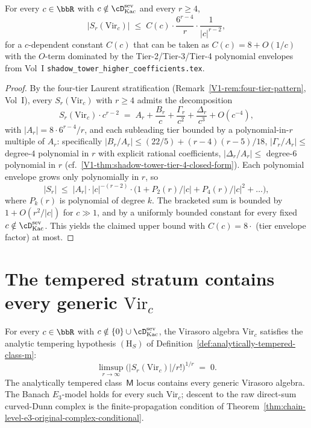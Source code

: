 \begin{proposition}
\label{prop:virasoro-s-r-upper-bound}
For every $c \in \bbR$ with
$c \notin \cD^{\mathrm{sev}}_{\mathrm{Kac}}$ and every $r \ge 4$,
\[
 \lvert S_r(\mathrm{Vir}_c) \rvert
 \;\le\;
 C(c) \cdot \frac{6^{r - 4}}{r}
 \cdot
 \frac{1}{\lvert c \rvert^{r - 2}},
\]
for a $c$-dependent constant $C(c)$ that can be taken as
$C(c) = 8 + O(1/c)$ with the $O$-term dominated by the
Tier-2/Tier-3/Tier-4 polynomial envelopes from Vol~I
\texttt{shadow\_tower\_higher\_coefficients.tex}.
\end{proposition}

\begin{proof}
By the four-tier Laurent stratification
(Remark~\ref{V1-rem:four-tier-pattern}, Vol~I), every $S_r(\mathrm{Vir}_c)$
with $r \ge 4$ admits the decomposition
\[
 S_r(\mathrm{Vir}_c) \cdot c^{r-2}
 \;=\; A_r + \frac{B_r}{c} + \frac{\Gamma_r}{c^2} + \frac{\Delta_r}{c^3}
 + O(c^{-4}),
\]
with $\lvert A_r \rvert = 8 \cdot 6^{r-4} / r$, and each subleading
tier bounded by a polynomial-in-$r$ multiple of $A_r$: specifically
$\lvert B_r / A_r \rvert \le (22/5) + (r-4)(r-5)/18$,
$\lvert \Gamma_r / A_r \rvert \le$ degree-$4$ polynomial in $r$ with
explicit rational coefficients,
$\lvert \Delta_r / A_r \rvert \le$ degree-$6$ polynomial in $r$
(cf.\ \ref{V1-thm:shadow-tower-tier-4-closed-form}). Each polynomial
envelope grows only polynomially in $r$, so
\[
 \lvert S_r \rvert
 \;\le\;
 \lvert A_r \rvert \cdot \lvert c \rvert^{-(r-2)}
 \cdot \bigl( 1 + P_2(r) / \lvert c \rvert
 + P_4(r) / \lvert c \rvert^2 + \ldots \bigr),
\]
where $P_k(r)$ is polynomial of degree $k$. The bracketed sum is
bounded by $1 + O(r^2 / \lvert c \rvert)$ for $c \gg 1$, and by a
uniformly bounded constant for every fixed $c \notin
\cD^{\mathrm{sev}}_{\mathrm{Kac}}$. This yields the claimed upper
bound with $C(c) = 8 \cdot$ (tier envelope factor) at most.
\end{proof}

\section{The tempered stratum contains every generic $\mathrm{Vir}_c$}
\label{sec:tempered-stratum-virasoro}

\begin{theorem}
\label{thm:tempered-stratum-contains-virasoro}
For every $c \in \bbR$ with
$c \notin \{0\} \cup \cD^{\mathrm{sev}}_{\mathrm{Kac}}$, the Virasoro
algebra $\mathrm{Vir}_c$ satisfies the analytic tempering hypothesis
$(\mathrm{H}_S)$ of
Definition~\ref{def:analytically-tempered-class-m}:
\[
 \limsup_{r \to \infty}
 \bigl( \lvert S_r(\mathrm{Vir}_c) \rvert / r! \bigr)^{1/r}
 \;=\;
 0.
\]
The analytically tempered class~$\mathsf M$ locus contains every
generic Virasoro algebra. The Banach $E_3$-model holds for every such
$\mathrm{Vir}_c$; descent to the raw direct-sum curved-Dunn complex
is the finite-propagation condition of
Theorem~\ref{thm:chain-level-e3-original-complex-conditional}.
\end{theorem}

